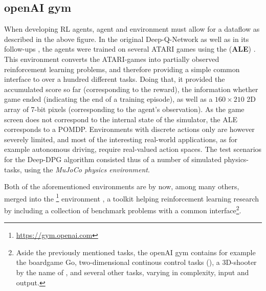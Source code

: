 \subsection{openAI gym}

When developing RL agents, agent and environment must allow for a dataflow as described in the above figure. In the original Deep-Q-Network \cite{mnih_playing_2013} as well as in its follow-ups \cite{van_hasselt_deep_2015, wang_dueling_2015}, the agents were trained on several ATARI games using the  (\textbf{ALE}) \cite{bellemare_arcade_2012}. This environment converts the ATARI-games into partially observed reinforcement learning problems, and therefore providing a simple common interface to over a hundred different tasks. Doing that, it provided the accumulated score so far (corresponding to the reward), the information whether game ended (indicating the end of a training episode), as well as a $160 \times 210$  2D array of 7-bit pixels (corresponding to the agent's observation). As the game screen does not correspond to the internal state of the simulator, the ALE corresponds to a POMDP. Environments with discrete actions only are however severely limited, and most of the interesting real-world applications, as for example autonomous driving, require real-valued action spaces. The test scenarios for the Deep-DPG algorithm consisted thus of a number of simulated physics-tasks, using the \textit{MuJoCo physics environment}. 

Both of the aforementioned environments are by now, among many others, merged into the \footnote{\url{https://gym.openai.com}} environment \cite{brockman_openai_2016}, a toolkit helping reinforcement learning research by including a collection of benchmark problems with a common interface\footnote{Aside the previously mentioned tasks, the openAI gym contains for example the boardgame Go, two-dimensional continous control tasks (), a 3D-shooter by the name of , and several other tasks, varying in complexity, input and output.}.

